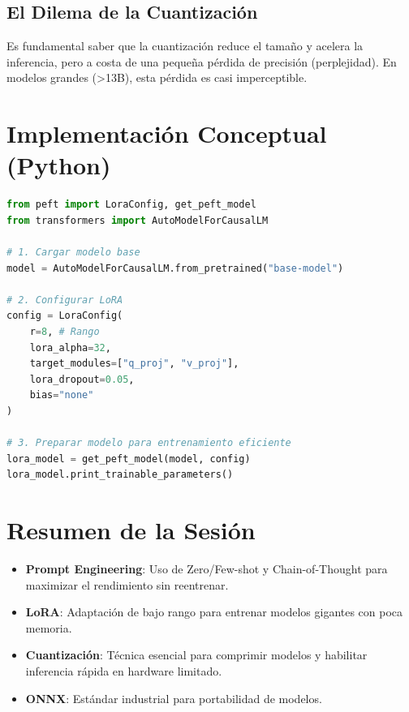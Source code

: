 \documentclass[12pt,a4paper,openany,oneside]{book}
\begin{document}
\subsection{El Dilema de la Cuantización}
Es fundamental saber que la cuantización reduce el tamaño y acelera la inferencia, pero a costa de una pequeña pérdida de precisión (perplejidad). En modelos grandes (>13B), esta pérdida es casi imperceptible.

\section{Implementación Conceptual (Python)}

\begin{lstlisting}[language=Python]
from peft import LoraConfig, get_peft_model
from transformers import AutoModelForCausalLM

# 1. Cargar modelo base
model = AutoModelForCausalLM.from_pretrained("base-model")

# 2. Configurar LoRA
config = LoraConfig(
    r=8, # Rango
    lora_alpha=32,
    target_modules=["q_proj", "v_proj"],
    lora_dropout=0.05,
    bias="none"
)

# 3. Preparar modelo para entrenamiento eficiente
lora_model = get_peft_model(model, config)
lora_model.print_trainable_parameters()
\end{lstlisting}

\section{Resumen de la Sesión}
\begin{itemize}
    \item \textbf{Prompt Engineering}: Uso de Zero/Few-shot y Chain-of-Thought para maximizar el rendimiento sin reentrenar.
    \item \textbf{LoRA}: Adaptación de bajo rango para entrenar modelos gigantes con poca memoria.
    \item \textbf{Cuantización}: Técnica esencial para comprimir modelos y habilitar inferencia rápida en hardware limitado.
    \item \textbf{ONNX}: Estándar industrial para portabilidad de modelos.
\end{itemize}
\end{document}
